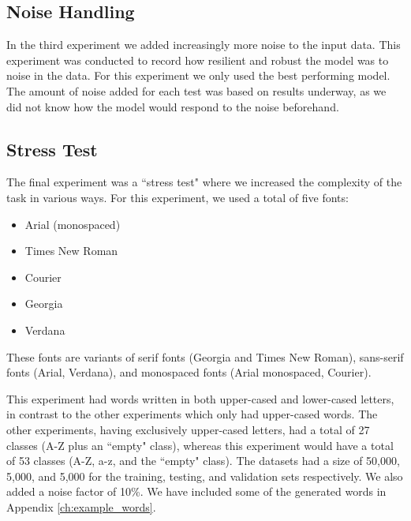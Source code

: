 \subsection{Noise Handling}
In the third experiment we added increasingly more noise to the input data. This experiment was conducted to record how resilient and robust the model was to noise in the data. For this experiment we only used the best performing model. The amount of noise added for each test was based on results underway, as we did not know how the model would respond to the noise beforehand.

\subsection{Stress Test}
The final experiment was a ``stress test" where we increased the complexity of the task in various ways. For this experiment, we used a total of five fonts:

\begin{itemize}
    \item Arial (monospaced)
    \item Times New Roman
    \item Courier
    \item Georgia
    \item Verdana
\end{itemize}

These fonts are variants of serif fonts (Georgia and Times New Roman), sans-serif fonts (Arial, Verdana), and monospaced fonts (Arial monospaced, Courier).

This experiment had words written in both upper-cased and lower-cased letters, in contrast to the other experiments which only had upper-cased words. The other experiments, having exclusively upper-cased letters, had a total of 27 classes (A-Z plus an ``empty" class), whereas this experiment would have a total of 53 classes (A-Z, a-z, and the ``empty" class). The datasets had a size of 50,000, 5,000, and 5,000 for the training, testing, and validation sets respectively. We also added a noise factor of 10\%. We have included some of the generated words in Appendix \ref{ch:example_words}.